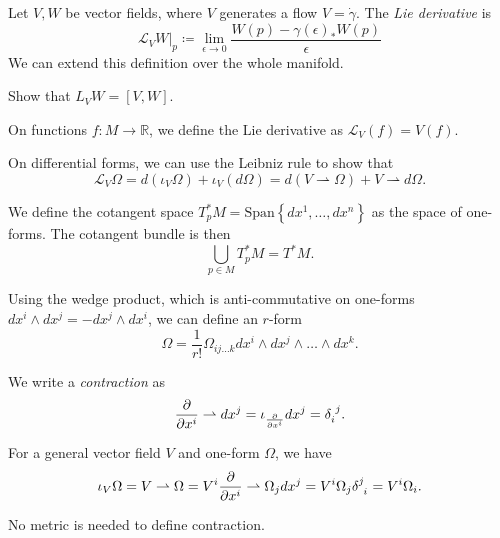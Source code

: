
\begin{definition}
  Let $V, W$ be vector fields, where $V$ generates a flow $V = \dot{\gamma}$. The \emph{Lie derivative} is
  \begin{equation}
    \mathcal{L}_V W \rvert_p \coloneqq \lim_{\epsilon \to 0} \frac{W(p) - \gamma(\epsilon)_* W(p)}{\epsilon}
  \end{equation}
  We can extend this definition over the whole manifold.
\end{definition}
\begin{exercise}
  Show that $L_V W = [V, W]$.
\end{exercise}
\begin{definition}[]
  On functions $f \colon M \to \mathbb{R}$, we define the Lie derivative as $\mathcal{L}_V(f) = V(f)$.
\end{definition}
\begin{claim}
  On differential forms, we can use the Leibniz rule to show that
  \begin{equation}
    \mathcal{L}_V \Omega = d(\iota_V \Omega) + \iota_V (d\Omega) = d (V \rightharpoonup \Omega) + V \rightharpoonup d\Omega.
  \end{equation}
\end{claim}
\begin{definition}[]
  We define the cotangent space $T^*_p M = \text{Span}\left\{dx^1, \dots, dx^n\right\}$ as the space of one-forms.
  The cotangent bundle is then
  \begin{equation}
    \bigcup_{p\in M} T^*_p M = T^* M.
  \end{equation}
\end{definition}
\begin{definition}[$r$-form]
  Using the wedge product, which is anti-commutative on one-forms $dx^{i} \wedge dx^{j} = -dx^{j} \wedge dx^{i}$, we can define an $r$-form 
  \begin{equation}
    \Omega = \frac{1}{r!} \Omega_{ij \dots k} dx^{i} \wedge dx^{j} \wedge \dots \wedge dx^k.
  \end{equation}
\end{definition}
\begin{definition}[contraction]
  We write a \emph{contraction} as
  \begin{equation}
    \frac{\partial }{\partial x^{i}} \rightharpoonup dx^{j} = \iota_{\frac{\partial }{\partial x^{i}}} dx^{j} = \delta\indices{_{i}^{j}}.
  \end{equation}
\end{definition}
For a general vector field $V$ and one-form $ \Omega$, we have
\begin{equation}
\iota_V \Omega = V \rightharpoonup \Omega = V^{i} \frac{\partial }{\partial x^{i}} \rightharpoonup \Omega_j dx^{j} = V^{i} \Omega_{j} \delta\indices{^{j}_{i}} = V^{i} \Omega_{i}.
\end{equation}
\begin{remark}
  No metric is needed to define contraction.
\end{remark}

